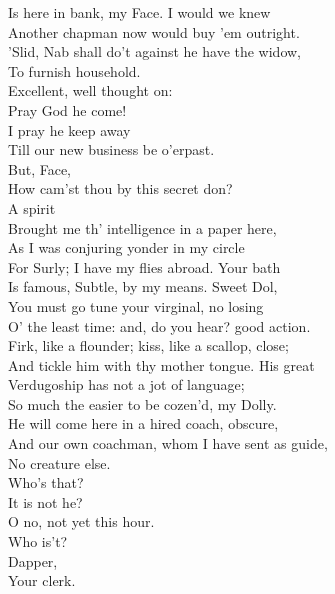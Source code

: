 \documentclass[a4paper,oneside]{memoir}
\begin{document}
\begin{drama*}
Is here in bank, my Face. I would we knew\\
Another chapman now would buy 'em outright.\\
\facespeaks 'Slid, Nab shall do't against he have the widow,\\
To furnish household.\\
\subtlespeaks {} Excellent, well thought on:\\
Pray God he come!\\
\facespeaks {} I pray he keep away\\
Till our new business be o'erpast.\\
\subtlespeaks But, Face,\\
How cam'st thou by this secret don?\\
\facespeaks {} A spirit\\
Brought me th' intelligence in a paper here,\\
As I was conjuring yonder in my circle\\
For Surly; I have my flies abroad. Your bath\\
Is famous, Subtle, by my means. Sweet Dol,\\
You must go tune your virginal, no losing\\
O' the least time: and, do you hear? good action.\\
Firk, like a flounder; kiss, like a scallop, close;\\
And tickle him with thy mother tongue. His great\\
Verdugoship has not a jot of language;\\
So much the easier to be cozen'd, my Dolly.\\
He will come here in a hired coach, obscure,\\
And our own coachman, whom I have sent as guide,\\
No creature else.\\
Who's that?\\
\subtlespeaks {} It is not he?\\
\facespeaks {} O no, not yet this hour.\\
\subtlespeaks Who is't?\\
\dolspeaks {} Dapper,\\
Your clerk.\\

\end{drama*}
\end{document}
